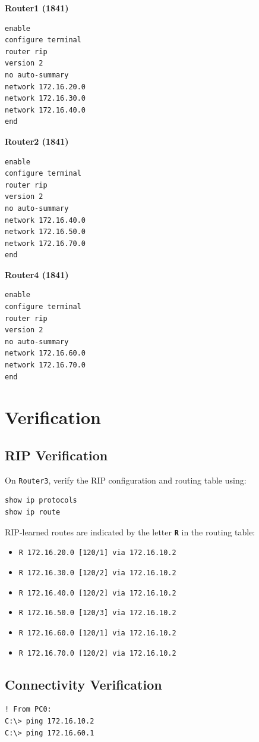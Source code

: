 \documentclass[12pt, a4paper]{report}
\begin{document}
\textbf{Router1 (1841)}
\begin{lstlisting}
enable
configure terminal
router rip
version 2
no auto-summary
network 172.16.20.0
network 172.16.30.0
network 172.16.40.0
end
\end{lstlisting}

\textbf{Router2 (1841)}
\begin{lstlisting}
enable
configure terminal
router rip
version 2
no auto-summary
network 172.16.40.0
network 172.16.50.0
network 172.16.70.0
end
\end{lstlisting}

\textbf{Router4 (1841)}
\begin{lstlisting}
enable
configure terminal
router rip
version 2
no auto-summary
network 172.16.60.0
network 172.16.70.0
end
\end{lstlisting}

\section*{Verification}
\subsection*{RIP Verification}
On \texttt{Router3}, verify the RIP configuration and routing table using:
\begin{lstlisting}
show ip protocols
show ip route
\end{lstlisting}
RIP-learned routes are indicated by the letter \textbf{\texttt{R}} in the routing table:
\begin{itemize}
	\item \texttt{R 172.16.20.0 [120/1] via 172.16.10.2}
	\item \texttt{R 172.16.30.0 [120/2] via 172.16.10.2}
	\item \texttt{R 172.16.40.0 [120/2] via 172.16.10.2}
	\item \texttt{R 172.16.50.0 [120/3] via 172.16.10.2}
	\item \texttt{R 172.16.60.0 [120/1] via 172.16.10.2}
	\item \texttt{R 172.16.70.0 [120/2] via 172.16.10.2}
\end{itemize}

\subsection*{Connectivity Verification}
\begin{lstlisting}
! From PC0:
C:\> ping 172.16.10.2
C:\> ping 172.16.60.1
\end{lstlisting}
\end{document}
